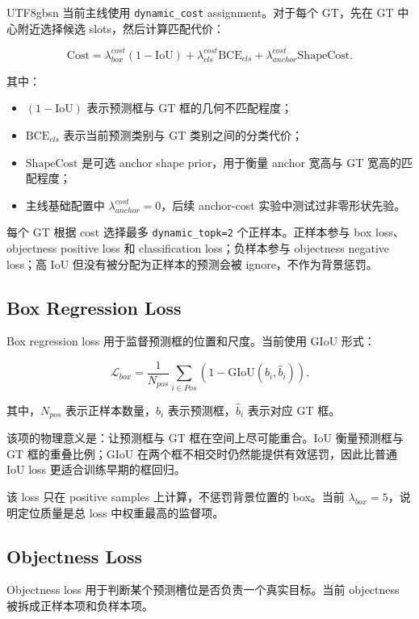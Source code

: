 \documentclass[11pt,a4paper]{article}
\newcommand{\code}[1]{\texttt{#1}}
\begin{document}
\begin{CJK*}{UTF8}{gbsn}
当前主线使用 \code{dynamic\_cost} assignment。对于每个 GT，先在 GT 中心附近选择候选 slots，然后计算匹配代价：

\[
  \mathrm{Cost}
  =
  \lambda_{box}^{cost}(1-\mathrm{IoU})
  +
  \lambda_{cls}^{cost}\mathrm{BCE}_{cls}
  +
  \lambda_{anchor}^{cost}\mathrm{ShapeCost}.
\]

其中：

\begin{itemize}
  \item $(1-\mathrm{IoU})$ 表示预测框与 GT 框的几何不匹配程度；
  \item $\mathrm{BCE}_{cls}$ 表示当前预测类别与 GT 类别之间的分类代价；
  \item $\mathrm{ShapeCost}$ 是可选 anchor shape prior，用于衡量 anchor 宽高与 GT 宽高的匹配程度；
  \item 主线基础配置中 $\lambda_{anchor}^{cost}=0$，后续 anchor-cost 实验中测试过非零形状先验。
\end{itemize}

每个 GT 根据 cost 选择最多 \code{dynamic\_topk=2} 个正样本。正样本参与 box loss、objectness positive loss 和 classification loss；负样本参与 objectness negative loss；高 IoU 但没有被分配为正样本的预测会被 ignore，不作为背景惩罚。

\subsection{Box Regression Loss}

Box regression loss 用于监督预测框的位置和尺度。当前使用 GIoU 形式：

\[
  \mathcal{L}_{box}
  =
  \frac{1}{N_{pos}}
  \sum_{i\in Pos}
  \left(1-\mathrm{GIoU}(b_i,\hat{b}_i)\right).
\]

其中，$N_{pos}$ 表示正样本数量，$b_i$ 表示预测框，$\hat{b}_i$ 表示对应 GT 框。

该项的物理意义是：让预测框与 GT 框在空间上尽可能重合。IoU 衡量预测框与 GT 框的重叠比例；GIoU 在两个框不相交时仍然能提供有效惩罚，因此比普通 IoU loss 更适合训练早期的框回归。

该 loss 只在 positive samples 上计算，不惩罚背景位置的 box。当前 $\lambda_{box}=5$，说明定位质量是总 loss 中权重最高的监督项。

\subsection{Objectness Loss}

Objectness loss 用于判断某个预测槽位是否负责一个真实目标。当前 objectness 被拆成正样本项和负样本项。


\end{CJK*}
\end{document}
